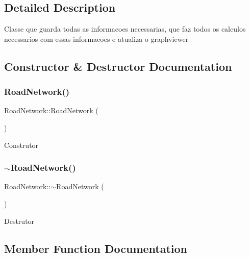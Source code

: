 \subsection{Detailed Description}
Classe que guarda todas as informacoes necessarias, que faz todos os calculos necessarios com essas informacoes e atualiza o graphviewer 

\subsection{Constructor \& Destructor Documentation}
\mbox{\label{class_road_network_a635cd53a27194c18870f6afc1f9e54cf}} 
\subsubsection{\texorpdfstring{Road\+Network()}{RoadNetwork()}}
{\footnotesize\ttfamily Road\+Network\+::\+Road\+Network (\begin{DoxyParamCaption}{ }\end{DoxyParamCaption})}

Construtor \mbox{\label{class_road_network_a03a442c7c5c89bab9bb10632caefd2eb}} 
\subsubsection{\texorpdfstring{$\sim$\+Road\+Network()}{~RoadNetwork()}}
{\footnotesize\ttfamily Road\+Network\+::$\sim$\+Road\+Network (\begin{DoxyParamCaption}{ }\end{DoxyParamCaption})\hspace{0.3cm}{\ttfamily [virtual]}}

Destrutor 

\subsection{Member Function Documentation}
\mbox{\label{class_road_network_abea5273df933a75aa0a32c437b68d9b8}} 
